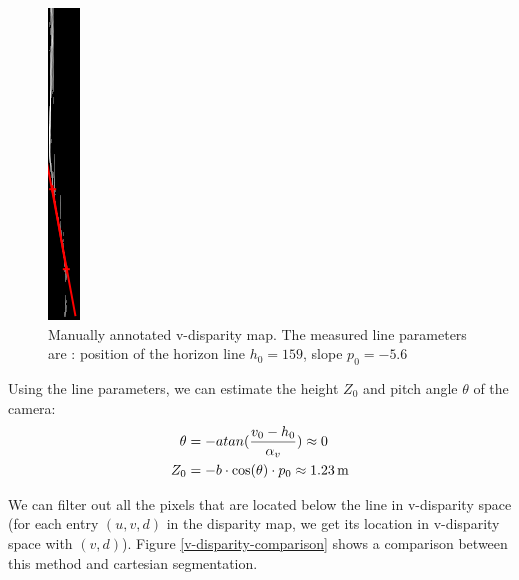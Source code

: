 \documentclass[a4paper,11pt]{article}
\begin{document}
\begin{figure}[H]
\centering
\includegraphics[scale=0.5]{pic/v-disparity-labeled.png}
\caption{Manually annotated v-disparity map. The measured line parameters are : position of the horizon line $ h_0 = 159 $, slope $ p_0 = -5.6 $ }
\label{ransac-line}
\end{figure}

Using the line parameters, we can estimate the height $Z_0$ and pitch angle $\theta$ of the camera:
\begin{align*}
\theta &= -atan(\frac{v_0-h_0}{\alpha_v}) \approx 0 \\
Z_0 &= -b\cdot\cos(\theta)\cdot p_0 \approx \unit[1.23]{m}
\end{align*} 


We can filter out all the pixels that are located below the line in v-disparity space (for each entry $(u, v, d)$ in the disparity map, we get its location in v-disparity space with $(v, d)$). Figure \ref{v-disparity-comparison} shows a comparison between this method and cartesian segmentation.
\end{document}
